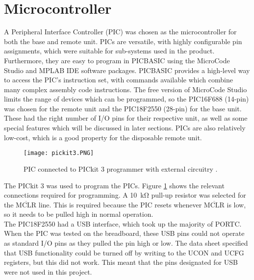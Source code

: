 \section{Microcontroller}
A Peripheral Interface Controller (PIC) was chosen as the microcontroller for both the base and remote unit. PICs are versatile, with highly configurable pin assignments, which were suitable for sub-systems used in the product. Furthermore, they are easy to program in PICBASIC using the MicroCode Studio \cite{microcode_studio} and MPLAB IDE software packages. PICBASIC provides a high-level way to access the PIC's instruction set, with commands available which combine many complex assembly code instructions. The free version of MicroCode Studio limits the range of devices which can be programmed, so the PIC16F688 (14-pin) \cite{pic16f688} was chosen for the remote unit and the PIC18F2550 (28-pin) \cite{pic18f2550} for the base unit. These had the right number of I/O pins for their respective unit, as well as some special features which will be discussed in later sections. PICs are also relatively low-cost, which is a good property for the disposable remote unit.\\

\begin{figure}[htb]
	\centering
	\texttt{[image: pickit3.PNG]}
	\caption{PIC connected to PICkit 3 programmer with external circuitry \cite{pickit3}.}
	\label{fig: pickit3}
\end{figure}

The PICkit 3 \cite{pickit3} was used to program the PICs. Figure \ref{fig: pickit3} shows the relevant connections required for programming. A \SI{10}{\kilo\ohm} pull-up resistor was selected for the $\overline{\text{MCLR}}$ line. This is required because the PIC resets whenever $\overline{\text{MCLR}}$ is low, so it needs to be pulled high in normal operation. \\

The PIC18F2550 had a USB interface, which took up the majority of PORTC. When the PIC was tested on the breadboard, these USB pins could not operate as standard I/O pins as they pulled the pin high or low. The data sheet specified that USB functionality could be turned off by writing to the UCON and UCFG registers, but this did not work. This meant that the pins designated for USB were not used in this project.\\

